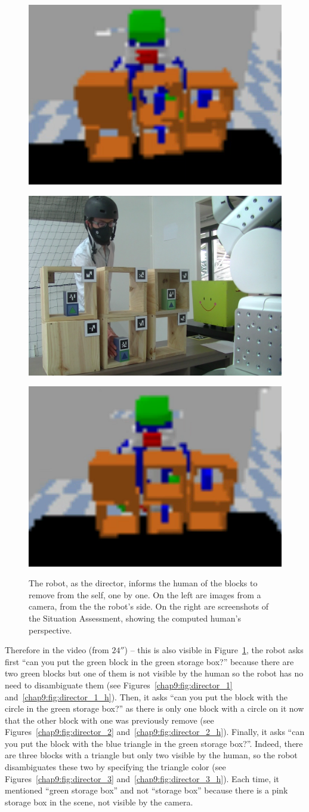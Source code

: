 \documentclass[a4paper,11pt,twoside]{StyleThese}
\begin{document}
\begin{figure}[!t]
\begin{subfloat}{
			\label{chap9:fig:director_2_h}\includegraphics[width=0.4\linewidth]{figures/chapter4/director_2_h_view.png}}
	\end{subfloat}
	\begin{subfloat}{\label{chap9:fig:director_3}
			\includegraphics[width=0.4\linewidth]{figures/chapter4/director_3.png}}\hfill
	\end{subfloat}
	\begin{subfloat}{\label{chap9:fig:director_3_h}
			\includegraphics[width=0.4\linewidth]{figures/chapter4/director_3_h_view.png}}
	\end{subfloat}
	\caption{The robot, as the director, informs the human of the blocks to remove from the self, one by one. On the left are images from a camera, from the the robot's side. On the right are screenshots of the Situation Assessment, showing the computed human's perspective.}
	\label{chap9:fig:director}
\end{figure}

Therefore in the video (from $24''$) -- this is also visible in Figure~\ref{chap9:fig:director}, the robot asks first ``can you put the green block in the green storage box?'' because there are two green blocks but one of them is not visible by the human so the robot has no need to disambiguate them (see Figures~\ref{chap9:fig:director_1} and~\ref{chap9:fig:director_1_h}). Then, it asks ``can you put the block with the circle in the green storage box?'' as there is only one block with a circle on it now that the other block with one was previously remove (see Figures~\ref{chap9:fig:director_2} and~\ref{chap9:fig:director_2_h}). Finally, it asks ``can you put the block with the blue triangle in the green storage box?''. Indeed, there are three blocks with a triangle but only two visible by the human, so the robot disambiguates these two by specifying the triangle color (see Figures~\ref{chap9:fig:director_3} and~\ref{chap9:fig:director_3_h}). Each time, it mentioned ``green storage box'' and not ``storage box'' because there is a pink storage box in the scene, not visible by the camera.
\end{document}
